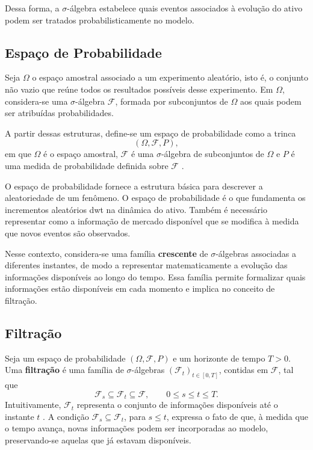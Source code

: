 Dessa forma, a $\sigma$-álgebra estabelece quais eventos associados à
evolução do ativo podem ser tratados probabilisticamente no modelo.

\subsection{Espaço de Probabilidade}

Seja \(\Omega\) o espaço amostral associado a um experimento aleatório, isto é, o conjunto não vazio que reúne todos os resultados possíveis desse experimento. Em \(\Omega\), considera-se uma \(\sigma\)-álgebra \(\mathcal{F}\), formada por subconjuntos de \(\Omega\) aos quais podem ser atribuídas probabilidades.

A partir dessas estruturas, define-se um espaço de probabilidade como a trinca 
\begin{equation}
(\Omega,\mathcal{F},P),
\end{equation}
em que \(\Omega\) é o espaço amostral, \(\mathcal{F}\) é uma \(\sigma\)-álgebra de subconjuntos de \(\Omega\) e \(P\) é uma medida de probabilidade definida sobre  $\mathcal{F}$ \cite{albani2025}.

O espaço de probabilidade fornece a estrutura básica para descrever a aleatoriedade de um fenômeno. O espaço de probabilidade é o que fundamenta os incrementos aleatórios dwt na dinâmica do ativo. Também é necessário representar como a informação  de mercado disponível que se modifica à medida que novos eventos são observados.

Nesse contexto, considera-se uma família \textbf{crescente} de $\sigma$-álgebras associadas a diferentes instantes, de modo a representar matematicamente a evolução das informações disponíveis ao longo do tempo. Essa família permite formalizar quais informações estão disponíveis em cada momento e implica no conceito de filtração.

\subsection{Filtração}
Seja um espaço de probabilidade
$(\Omega,\mathcal{F},P)$ e um horizonte de tempo $T>0$.
Uma \textbf{filtração} é uma família de $\sigma$-álgebras
$(\mathcal{F}_t)_{t\in[0,T]}$, contidas em $\mathcal{F}$, tal que
\begin{equation}
\mathcal{F}_s \subseteq \mathcal{F}_t \subseteq \mathcal{F},
\qquad
0 \leq s \leq t \leq T.
\end{equation}
Intuitivamente, $\mathcal{F}_t$ representa o conjunto de informações
disponíveis até o instante $t$ \cite{saporito2024}. A condição
$\mathcal{F}_s \subseteq \mathcal{F}_t$, para $s \leq t$, expressa
o fato de que, à medida que o tempo avança, novas informações podem
ser incorporadas ao modelo, preservando-se aquelas que já estavam
disponíveis.

